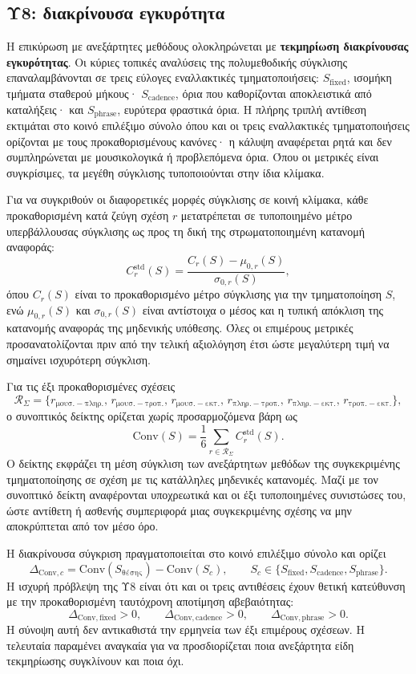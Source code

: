 \documentclass[11pt,a4paper]{article}
\begin{document}
\subsection{Υ8: διακρίνουσα εγκυρότητα}\label{app:stats-disc}

Η επικύρωση με ανεξάρτητες μεθόδους ολοκληρώνεται με \textbf{τεκμηρίωση διακρίνουσας εγκυρότητας}. Οι κύριες τοπικές αναλύσεις της πολυμεθοδικής σύγκλισης επαναλαμβάνονται σε τρεις εύλογες εναλλακτικές τμηματοποιήσεις: \(S_{\mathrm{fixed}}\), ισομήκη τμήματα σταθερού μήκους· \(S_{\mathrm{cadence}}\), όρια που καθορίζονται αποκλειστικά από καταλήξεις· και \(S_{\mathrm{phrase}}\), ευρύτερα φραστικά όρια. Η πλήρης τριπλή αντίθεση εκτιμάται στο κοινό επιλέξιμο σύνολο όπου και οι τρεις εναλλακτικές τμηματοποιήσεις ορίζονται με τους προκαθορισμένους κανόνες· η κάλυψη αναφέρεται ρητά και δεν συμπληρώνεται με μουσικολογικά ή προβλεπόμενα όρια. Όπου οι μετρικές είναι συγκρίσιμες, τα μεγέθη σύγκλισης τυποποιούνται στην ίδια κλίμακα.

Για να συγκριθούν οι διαφορετικές μορφές σύγκλισης σε κοινή κλίμακα, κάθε προκαθορισμένη κατά ζεύγη σχέση \(r\) μετατρέπεται σε τυποποιημένο μέτρο υπερβάλλουσας σύγκλισης ως προς τη δική της στρωματοποιημένη κατανομή αναφοράς:
\[
C_r^{\mathrm{std}}(S)
=
\frac{C_r(S)-\mu_{0,r}(S)}{\sigma_{0,r}(S)},
\]
όπου \(C_r(S)\) είναι το προκαθορισμένο μέτρο σύγκλισης για την τμηματοποίηση \(S\), ενώ \(\mu_{0,r}(S)\) και \(\sigma_{0,r}(S)\) είναι αντίστοιχα ο μέσος και η τυπική απόκλιση της κατανομής αναφοράς της μηδενικής υπόθεσης. Όλες οι επιμέρους μετρικές προσανατολίζονται πριν από την τελική αξιολόγηση έτσι ώστε μεγαλύτερη τιμή να σημαίνει ισχυρότερη σύγκλιση.

Για τις έξι προκαθορισμένες σχέσεις
\[
\mathcal R_{\Sigma}=
\{r_{\mathrm{μουσ.-πληρ.}},\,r_{\mathrm{μουσ.-τροπ.}},\,r_{\mathrm{μουσ.-εκτ.}},\,
r_{\mathrm{πληρ.-τροπ.}},\,r_{\mathrm{πληρ.-εκτ.}},\,r_{\mathrm{τροπ.-εκτ.}}\},
\]
ο συνοπτικός δείκτης ορίζεται χωρίς προσαρμοζόμενα βάρη ως
\[
\mathrm{Conv}(S)
=
\frac{1}{6}
\sum_{r\in\mathcal R_{\Sigma}}C_r^{\mathrm{std}}(S).
\]
Ο δείκτης εκφράζει τη μέση σύγκλιση των ανεξάρτητων μεθόδων της συγκεκριμένης τμηματοποίησης σε σχέση με τις κατάλληλες μηδενικές κατανομές. Μαζί με τον συνοπτικό δείκτη αναφέρονται υποχρεωτικά και οι έξι τυποποιημένες συνιστώσες του, ώστε αντίθετη ή ασθενής συμπεριφορά μιας συγκεκριμένης σχέσης να μην αποκρύπτεται από τον μέσο όρο.

Η διακρίνουσα σύγκριση πραγματοποιείται στο κοινό επιλέξιμο σύνολο και ορίζει
\[
\Delta_{\mathrm{Conv},c}
=
\mathrm{Conv}(S_{\mathrm{θέσης}})-\mathrm{Conv}(S_c),
\qquad
S_c\in\{S_{\mathrm{fixed}},S_{\mathrm{cadence}},S_{\mathrm{phrase}}\}.
\]
Η ισχυρή πρόβλεψη της Υ8 είναι ότι και οι τρεις αντιθέσεις έχουν θετική κατεύθυνση με την προκαθορισμένη ταυτόχρονη αποτίμηση αβεβαιότητας:
\[
\Delta_{\mathrm{Conv,fixed}}>0,\qquad
\Delta_{\mathrm{Conv,cadence}}>0,\qquad
\Delta_{\mathrm{Conv,phrase}}>0.
\]
Η σύνοψη αυτή δεν αντικαθιστά την ερμηνεία των έξι επιμέρους σχέσεων. Η τελευταία παραμένει αναγκαία για να προσδιορίζεται ποια ανεξάρτητα είδη τεκμηρίωσης συγκλίνουν και ποια όχι.
\end{document}
